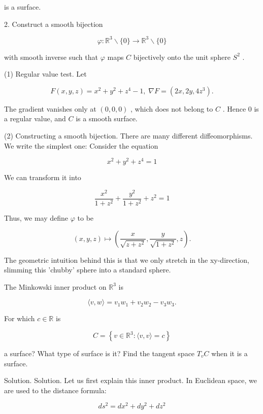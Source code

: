 \documentclass[10pt]{article}
\begin{document}
is a surface.

2. Construct a smooth bijection

\[
\varphi  : {\mathbb{R}}^{3} \smallsetminus  \{ 0\}  \rightarrow  {\mathbb{R}}^{3} \smallsetminus  \{ 0\}
\]

with smooth inverse such that \(\varphi\) maps \(C\) bijectively onto the unit sphere \({S}^{2}\) .

(1) Regular value test. Let

\[
F\left( {x,y,z}\right)  = {x}^{2} + {y}^{2} + {z}^{4} - 1,\;\nabla F = \left( {{2x},{2y},4{z}^{3}}\right) .
\]

The gradient vanishes only at \(\left( {0,0,0}\right)\) , which does not belong to \(C\) . Hence 0 is a regular value, and \(C\) is a smooth surface.

(2) Constructing a smooth bijection. There are many different diffeomorphisms. We write the simplest one: Consider the equation

\[
{x}^{2} + {y}^{2} + {z}^{4} = 1
\]

We can transform it into

\[
\frac{{x}^{2}}{1 + {z}^{2}} + \frac{{y}^{2}}{1 + {z}^{2}} + {z}^{2} = 1
\]

Thus, we may define \(\varphi\) to be

\[
\left( {x,y,z}\right)  \mapsto  \left( {\frac{x}{\sqrt{z + {z}^{2}}},\frac{y}{\sqrt{1 + {z}^{2}}},z}\right) .
\]

The geometric intuition behind this is that we only stretch in the xy-direction, slimming this 'chubby' sphere into a standard sphere.

\begin{problem}[title=PROBLEM 3 (5 POINTS)]
The Minkowski inner product on \({\mathbb{R}}^{3}\) is

\[
\langle v,w\rangle  = {v}_{1}{w}_{1} + {v}_{2}{w}_{2} - {v}_{3}{w}_{3}.
\]

For which \(c \in  \mathbb{R}\) is

\[
C = \left\{  {v \in  {\mathbb{R}}^{3} : \langle v,v\rangle  = c}\right\}
\]

a surface? What type of surface is it? Find the tangent space \({T}_{v}C\) when it is a surface.
\end{problem}

Solution. Solution. Let us first explain this inner product. In Euclidean space, we are used to the distance formula:

\[
d{s}^{2} = d{x}^{2} + d{y}^{2} + d{z}^{2}
\]
\end{document}
